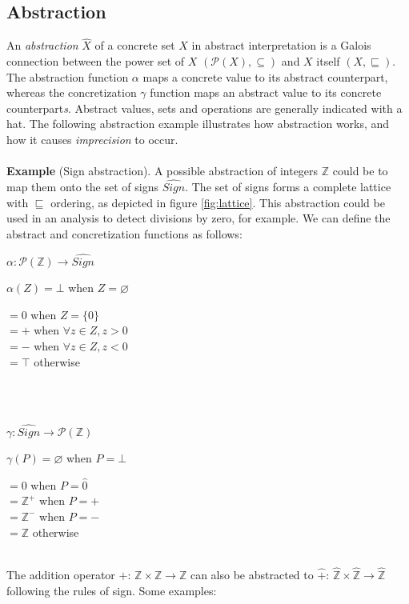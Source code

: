 \subsection{Abstraction}
An \textit{abstraction} $\hat{X}$ of a concrete set $X$ in abstract interpretation is a Galois connection between the power set of $X$ $(\mathcal{P}(X),\subseteq)$ and $X$ itself $(X,\sqsubseteq)$. The abstraction function $\alpha$ maps a concrete value to its abstract counterpart, whereas the concretization $\gamma$ function maps an abstract value to its concrete counterpart\textit{s}. Abstract values, sets and operations are generally indicated with a hat. The following abstraction example illustrates how abstraction works, and how it causes \textit{imprecision} to occur.\\\\
\textbf{Example} (Sign abstraction). A possible abstraction of integers $\mathbb{Z}$ could be to map them onto the set of signs $\widehat{Sign}$. The set of signs forms a complete lattice with $\sqsubseteq$ ordering, as depicted in figure \ref{fig:lattice}. This abstraction could be used in an analysis to detect divisions by zero, for example. We can define the abstract and concretization functions as follows:\\


\centerline{$\alpha:\mathcal{P}(\mathbb{Z}) \rightarrow \widehat{Sign}$}
\centerline{$\alpha(Z) = \bot$ when $Z = \varnothing$}
\begin{addmargin}[5.84cm]{1em}%
$= 0$ when $Z = \{0\}$\\
$= +$ when $\forall z \in Z, z > 0$\\
$= -$ when $\forall z \in Z, z < 0$\\
$= \top$ otherwise
\end{addmargin}
\leavevmode \\\\
\centerline{$\gamma:\widehat{Sign} \rightarrow \mathcal{P}(\mathbb{Z})$}
\centerline{$\gamma(P) = \varnothing$ when $P = \bot$}
\begin{addmargin}[5.84cm]{1em}%
$= {0}$ when $P = \hat{0}$\\
$= \mathbb{Z}^+$ when $P = +$\\
$= \mathbb{Z}^-$ when $P = -$\\
$= \mathbb{Z}$ otherwise\\
\end{addmargin}
\leavevmode \\
The addition operator $+$: $\mathbb{Z}\times\mathbb{Z}\rightarrow\mathbb{Z}$ can also be abstracted to $\hat{+}$: $\hat{\mathbb{Z}}\times\hat{\mathbb{Z}}\rightarrow\hat{\mathbb{Z}}$ following the rules of sign. Some examples:\\


